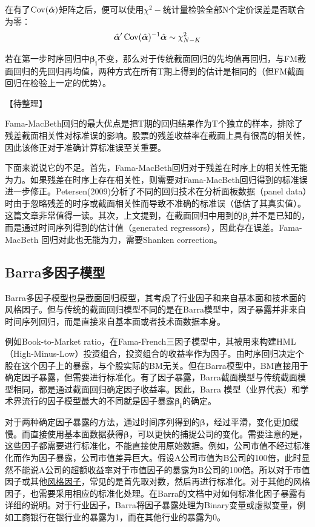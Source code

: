 \documentclass[11pt]{article}
\begin{document}
在有了$\operatorname{Cov}(\hat{\bm{\alpha}})$矩阵之后，便可以使用$\chi^2-$统计量检验全部N个定价误差是否联合为零：
\begin{equation*}
    \hat{\bm{\alpha}}' \operatorname{Cov}(\hat{\bm{\alpha}})^{-1} \hat{\bm{\alpha}} \sim \chi_{N-K}^{2}
\end{equation*}

若在第一步时序回归中$\bm{\beta_i}$不变，那么对于传统截面回归的先均值再回归，与FM截面回归的先回归再均值，两种方式在所有T期上得到的估计是相同的（但FM截面回归在检验上一定的优势）。

【待整理】

Fama-MacBeth回归的最大优点是把T期的回归结果作为T个独立的样本，排除了残差截面相关性对标准误的影响。股票的残差收益率在截面上具有很高的相关性，因此该修正对于准确计算标准误至关重要。

下面来说说它的不足。首先，Fama-MacBeth回归对于残差在时序上的相关性无能为力。如果残差在时序上存在相关性，则需要对Fama-MacBeth回归得到的标准误进一步修正。Petersen(2009)分析了不同的回归技术在分析面板数据（panel data）时由于忽略残差的时序或截面相关性而导致不准确的标准误（低估了其真实值）。这篇文章非常值得一读。其次，上文提到，在截面回归中用到的$\bm{\beta}_i$并不是已知的，而是通过时间序列得到的估计值（generated regressors），因此存在误差。Fama-MacBeth 回归对此也无能为力，需要Shanken correction。

\subsection{Barra多因子模型}

Barra多因子模型也是截面回归模型，其考虑了行业因子和来自基本面和技术面的风格因子。但与传统的截面回归模型不同的是在Barra模型中，因子暴露并非来自时间序列回归，而是直接来自基本面或者技术面数据本身。

例如Book-to-Market ratio，在Fama-French三因子模型中，其被用来构建HML（High-Minus-Low）投资组合，投资组合的收益率作为因子。由时序回归决定个股在这个因子上的暴露，与个股实际的BM无关。但在Barra模型中，BM直接用于确定因子暴露，但需要进行标准化。有了因子暴露，Barra截面模型与传统截面模型相同，都是通过截面回归确定因子收益率。因此，Barra 模型（业界代表）和学术界流行的因子模型最大的不同就是因子暴露$\bm{\beta_i}$的确定。

对于两种确定因子暴露的方法，通过时间序列得到的$\bm{\beta}$，经过平滑，变化更加缓慢。而直接使用基本面数据获得$\bm{\beta}$，可以更快的捕捉公司的变化。需要注意的是，这些因子都需要进行标准化，不能直接使用原始数据。例如，公司市值不经过标准化而作为因子暴露，公司市值差异巨大。假设A公司市值为B公司的100倍，此时显然不能说A公司的超额收益率对于市值因子的暴露为B公司的100倍。所以对于市值因子或其他\uline{风格因子}，常见的是首先取对数，然后再进行标准化。对于其他的风格因子，也需要采用相应的标准化处理。在Barra的文档中对如何标准化因子暴露有详细的说明。对于行业因子，Barra将因子暴露处理为Binary变量或虚拟变量，例如工商银行在银行业的暴露为1，而在其他行业的暴露为0。
\end{document}
